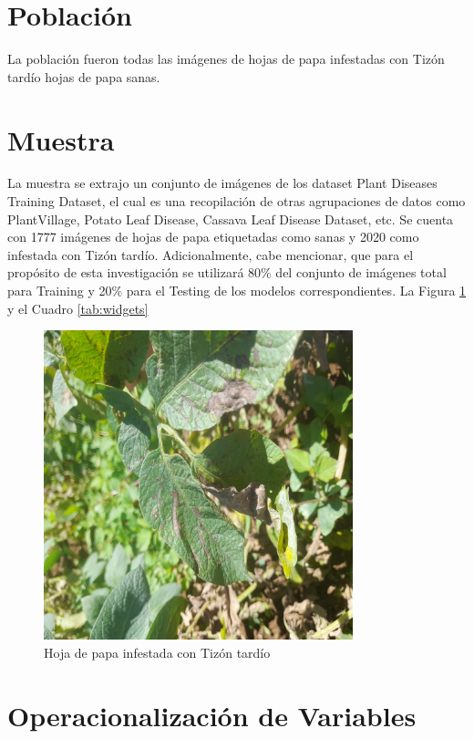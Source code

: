 \section{Población }
La población fueron todas las imágenes de hojas de papa infestadas con Tizón tardío hojas de papa sanas. 

\section{Muestra}
La muestra se extrajo un conjunto de imágenes de los dataset Plant Diseases Training Dataset, el cual es una recopilación de otras agrupaciones de datos como PlantVillage, Potato Leaf Disease, Cassava Leaf Disease Dataset, etc. Se cuenta con 1777 imágenes de hojas de papa etiquetadas como sanas y 2020 como infestada con Tizón tardío. Adicionalmente, cabe mencionar, que para el propósito de esta investigación se utilizará 80\% del conjunto de imágenes total para Training y 20\% para el Testing de los modelos correspondientes. La Figura \ref{fig1} y el Cuadro \ref{tab:widgets}

\begin{figure}[h]
	\begin{center}
		\includegraphics[width=0.8\textwidth]{3/figures/img.jpg}
		\caption{Hoja de papa infestada con Tizón tardío}
		\label{fig1}
	\end{center}
	
\end{figure}

\section{Operacionalización de Variables}

